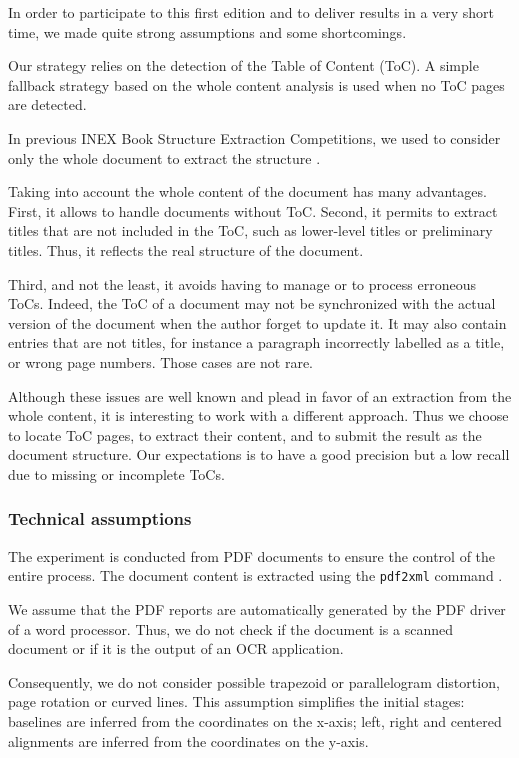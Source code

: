 In order to participate to this first edition and to deliver results in a very short time, we made quite strong assumptions and some shortcomings.

Our strategy relies on the detection of the Table of Content (ToC). A simple fallback strategy based on the whole content analysis is used when no ToC pages are detected.

In previous INEX Book Structure Extraction Competitions, we used to consider only the whole document to extract the structure \cite{10.1007/978-3-642-14556-8_18,DBLP:conf/inex/GiguetL10,Giguet2009}.

Taking into account the whole content of the document has many advantages. First, it allows to handle documents without ToC. Second, it permits to extract titles that are not included in the ToC, such as lower-level titles or preliminary titles. Thus, it reflects the real structure of the document. 

Third, and not the least, it avoids having to manage or to process erroneous ToCs. Indeed, the ToC of a document may not be synchronized with the actual version of the document when the author forget to update it. It may also contain entries that are not titles, for instance a paragraph incorrectly labelled as a title, or wrong page numbers. Those cases are not rare. 

Although these issues are well known and plead in favor of an extraction from the whole content, it is interesting to work with a different approach. Thus we choose to locate ToC pages, to extract their content, and to submit the result as the document structure. Our expectations is to have a good precision but a low recall due to missing or incomplete ToCs.

\subsubsection{Technical assumptions}

The experiment is conducted from PDF documents to ensure the control of
the entire process. The document content is extracted using the \texttt{pdf2xml} command \cite{Dejean:2007}.

We assume that the PDF reports are automatically generated by the PDF driver of a word processor. Thus, we do not check if the document is a scanned document or if it is the output of an OCR application. 

Consequently, we do not consider possible trapezoid or parallelogram distortion, page rotation or curved lines. This assumption simplifies the initial stages: baselines are inferred from the coordinates on the x-axis; left, right and centered alignments are inferred from the coordinates on the y-axis.

